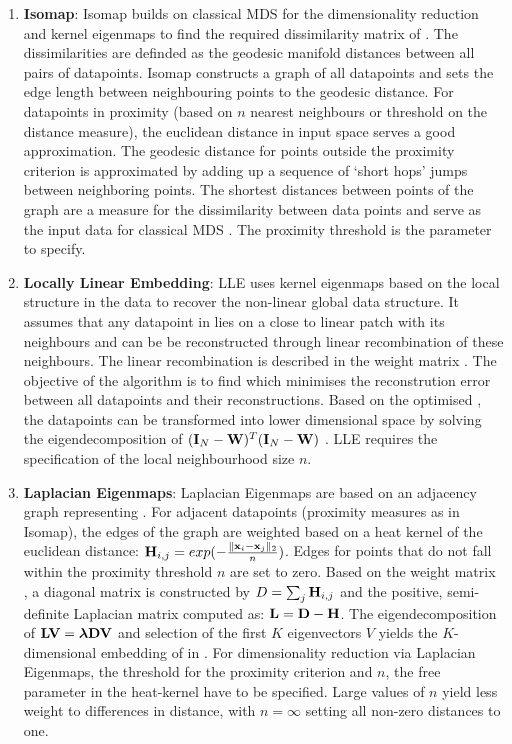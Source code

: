 \begin{enumerate}
\item\textbf{Isomap}: Isomap builds on classical MDS for the dimensionality reduction and kernel eigenmaps to find the required dissimilarity matrix of . The dissimilarities are definded as the geodesic manifold distances between all pairs of datapoints. Isomap constructs a graph of all datapoints and sets the edge length between neighbouring points to the geodesic distance. For datapoints in proximity (based on \(n\) nearest neighbours or threshold on the distance measure), the euclidean distance in input space serves a good approximation. The geodesic distance for points outside the proximity criterion is approximated by adding up a sequence of `short hops' jumps  between neighboring points. The shortest distances between points of the graph are a measure for the dissimilarity between data points and serve as the input data for classical MDS \citep{Tenenbaum2000}. The proximity threshold is the parameter to specify. 

\item\textbf{Locally Linear Embedding}: LLE uses kernel eigenmaps based on the local structure in the data to recover the non-linear global data structure. It assumes that any datapoint in  lies on a close to linear patch with its neighbours and can be be reconstructed through linear recombination of these neighbours. The linear recombination is described in the weight matrix . The objective of the algorithm is to find  which minimises the reconstrution error between all datapoints and their reconstructions. Based on the optimised , the datapoints  can be transformed into lower dimensional space  by solving the eigendecomposition of \((\boldsymbol{\mathbf{I}}_{N} -\boldsymbol{\mathbf{W}})^T(\boldsymbol{\mathbf{I}}_{N} -\boldsymbol{\mathbf{W}})\) \citep{Roweis2000}. LLE requires the specification of the local neighbourhood size \(n\). 

\item\textbf{Laplacian Eigenmaps}: Laplacian Eigenmaps are based on an adjacency graph representing . For adjacent datapoints (proximity measures as in Isomap), the edges of the graph are weighted based on a heat kernel of the euclidean distance: \(\boldsymbol{\mathbf{H}}_{i,j}=exp(-\frac{\lVert \boldsymbol{\mathbf{x}}_{i} - \boldsymbol{\mathbf{x}}_{j}\rVert_2}{n})\). Edges for points that do not fall within the proximity threshold \(n\) are set to zero.  Based on the weight matrix , a diagonal matrix  is constructed by \(D = \sum_{j} \boldsymbol{\mathbf{H}}_{i,j}\) and the positive, semi-definite Laplacian matrix  computed as: \(\boldsymbol{\mathbf{L}} = \boldsymbol{\mathbf{D}} - \boldsymbol{\mathbf{H}}\). The eigendecomposition of \(\boldsymbol{\mathbf{LV}} = \boldsymbol{\mathbf{\lambda DV}}\) and selection of the first \(K\) eigenvectors \(V\) yields the \(K\)-dimensional embedding of  in  \citep{Belkin2003}. For dimensionality reduction via Laplacian Eigenmaps, the threshold for the proximity criterion and \(n\), the free parameter in the heat-kernel have to be specified. Large values of \(n\) yield less weight to differences in distance, with \(n=\infty\) setting all non-zero distances to one. 
 

\end{enumerate}
